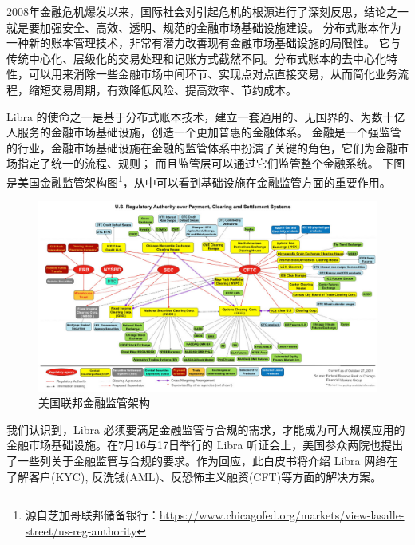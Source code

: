 2008年金融危机爆发以来，国际社会对引起危机的根源进行了深刻反思，结论之一就是要加强安全、高效、透明、规范的金融市场基础设施建设。
分布式账本作为一种新的账本管理技术，非常有潜力改善现有金融市场基础设施的局限性。
它与传统中心化、层级化的交易处理和记账方式截然不同。分布式账本的去中心化特性，可以用来消除一些金融市场中间环节、实现点对点直接交易，从而简化业务流程，缩短交易周期，有效降低风险、提高效率、节约成本。

Libra 的使命之一是基于分布式账本技术，建立一套通用的、无国界的、为数十亿人服务的金融市场基础设施，创造一个更加普惠的金融体系。
金融是一个强监管的行业，金融市场基础设施在金融的监管体系中扮演了关键的角色，它们为金融市场指定了统一的流程、规则；
而且监管层可以通过它们监管整个金融系统。
下图是美国金融监管架构图\footnote{源自芝加哥联邦储备银行：\url{https://www.chicagofed.org/markets/view-lasalle-street/us-reg-authority}}，从中可以看到基础设施在金融监管方面的重要作用。

\begin{figure}[h!]
    \centering
    \includegraphics[width=12cm, keepaspectratio]{images/regulatory-over-PCS.jpg}
    \caption{美国联邦金融监管架构}
    \label{fig:USAReg}
\end{figure}


我们认识到，Libra 必须要满足金融监管与合规的需求，才能成为可大规模应用的金融市场基础设施。在7月16与17日举行的 Libra 听证会上，美国参众两院也提出了一些列关于金融监管与合规的要求。作为回应，此白皮书将介绍 Libra 网络在了解客户(KYC), 反洗钱(AML)、反恐怖主义融资(CFT)等方面的解决方案。

